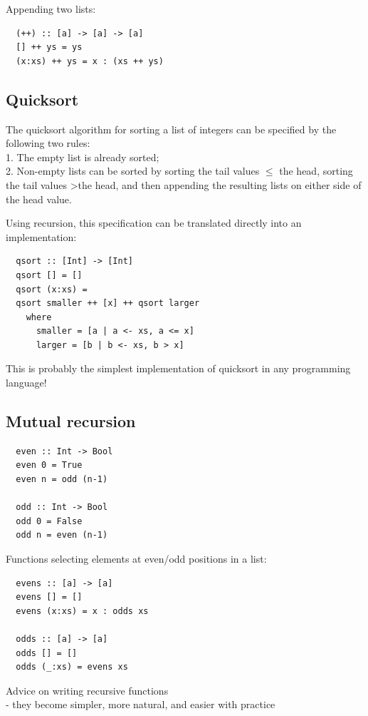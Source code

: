 \documentclass[tikz,border=10pt]{project_plan}
\begin{document}
Appending two lists:
\begin{lstlisting}
  (++) :: [a] -> [a] -> [a]
  [] ++ ys = ys
  (x:xs) ++ ys = x : (xs ++ ys)
\end{lstlisting}

\subsection{Quicksort}

The quicksort algorithm for sorting a list of integers can be
specified by the following two rules:\\
1. The empty list is already sorted;\\
2. Non-empty lists can be sorted by sorting the tail values
$\leq$ the head, sorting the tail values \textgreater the head, and then
appending the resulting lists on either side of the head
value.

Using recursion, this specification can be translated directly
into an implementation:
\begin{lstlisting}
  qsort :: [Int] -> [Int]
  qsort [] = []
  qsort (x:xs) =
  qsort smaller ++ [x] ++ qsort larger
    where
      smaller = [a | a <- xs, a <= x]
      larger = [b | b <- xs, b > x]
\end{lstlisting}

This is probably the simplest implementation of quicksort in any programming language!

\subsection{Mutual recursion}

\begin{lstlisting}
  even :: Int -> Bool
  even 0 = True
  even n = odd (n-1)

  odd :: Int -> Bool
  odd 0 = False
  odd n = even (n-1)
\end{lstlisting}

Functions selecting elements at even/odd
positions in a list:
\begin{lstlisting}
  evens :: [a] -> [a]
  evens [] = []
  evens (x:xs) = x : odds xs

  odds :: [a] -> [a]
  odds [] = []
  odds (_:xs) = evens xs
\end{lstlisting}

Advice on writing recursive functions\\
- they become simpler, more natural, and easier with practice
\end{document}
